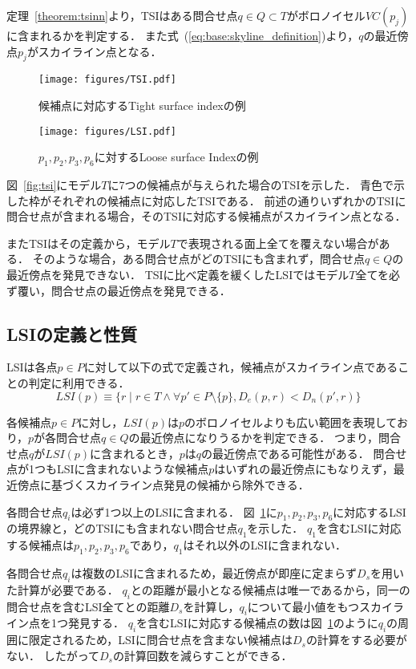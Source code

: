 \documentclass{fit}
\theoremstyle{definition}
\newcommand{\Fig}[1]{図~#1}
\newcommand{\Theo}[1]{定理~#1}
\newcommand{\Eq}[1]{式~(#1)}
\begin{document}
\Theo{\ref{theorem:tsinn}}より，TSIはある問合せ点$q \in Q \subset T$がボロノイセル$VC(p_j)$に含まれるかを判定する．
また\Eq{\ref{eq:base:skyline_definition}}より，$q$の最近傍点$p_j$がスカイライン点となる．

\begin{figure}[t]
  \centering
  \texttt{[image: figures/TSI.pdf]}
  \caption{候補点に対応するTight surface indexの例}
  \label{fig:tsi}

  \centering
  \texttt{[image: figures/LSI.pdf]}
  \caption{$p_1,p_2,p_3,p_6$に対するLoose surface Indexの例}
  \label{fig:lsi}
\end{figure}
\Fig{\ref{fig:tsi}}にモデル$T$に7つの候補点が与えられた場合のTSIを示した．
青色で示した枠がそれぞれの候補点に対応したTSIである．
前述の通りいずれかのTSIに問合せ点が含まれる場合，そのTSIに対応する候補点がスカイライン点となる．

またTSIはその定義から，モデル$T$で表現される面上全てを覆えない場合がある．
そのような場合，ある問合せ点がどのTSIにも含まれず，問合せ点$q \in Q$の最近傍点を発見できない．
TSIに比べ定義を緩くしたLSIではモデル$T$全てを必ず覆い，問合せ点の最近傍点を発見できる．

\subsection{LSIの定義と性質}
LSIは各点$p \in P$に対して以下の式で定義され，候補点がスカイライン点であることの判定に利用できる．
\begin{equation}
  LSI(p) \equiv \{ r \mid r \in T \wedge \forall p' \in P \setminus \{p\}, D_e(p,r) < D_n(p',r) \}
\end{equation}

各候補点$p \in P$に対し，$LSI(p)$は$p$のボロノイセルよりも広い範囲を表現しており，$p$が各問合せ点$q \in Q$の最近傍点になりうるかを判定できる．
つまり，問合せ点$q$が$LSI(p)$に含まれるとき，$p$は$q$の最近傍点である可能性がある．
問合せ点が1つもLSIに含まれないような候補点$p$はいずれの最近傍点にもなりえず，最近傍点に基づくスカイライン点発見の候補から除外できる．

各問合せ点$q_i$は必ず1つ以上のLSIに含まれる．
\Fig{\ref{fig:lsi}}に$p_1,p_2,p_3,p_6$に対応するLSIの境界線と，どのTSIにも含まれない問合せ点$q_1$を示した．
$q_1$を含むLSIに対応する候補点は$p_1,p_2,p_3,p_6$であり，$q_1$はそれ以外のLSIに含まれない．

各問合せ点$q_i$は複数のLSIに含まれるため，最近傍点が即座に定まらず$D_s$を用いた計算が必要である．
$q_i$との距離が最小となる候補点は唯一であるから，同一の問合せ点を含むLSI全てとの距離$D_s$を計算し，$q_i$について最小値をもつスカイライン点を1つ発見する．
$q_i$を含むLSIに対応する候補点の数は\Fig{\ref{fig:lsi}}のように$q_i$の周囲に限定されるため，LSIに問合せ点を含まない候補点は$D_s$の計算をする必要がない．
したがって$D_s$の計算回数を減らすことができる．
\end{document}
